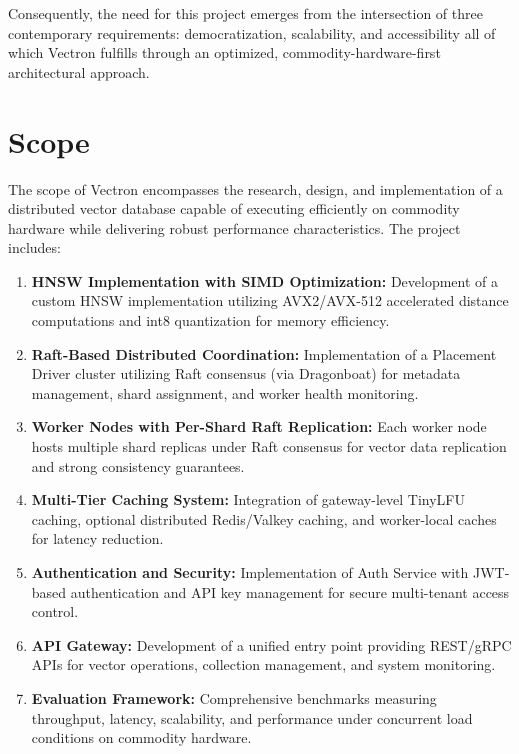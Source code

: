 
\noindent Consequently, the need for this project emerges from the intersection of three contemporary requirements: democratization, scalability, and accessibility all of which Vectron fulfills through an optimized, commodity-hardware-first architectural approach.

\section{Scope}

The scope of Vectron encompasses the research, design, and implementation of a distributed vector database capable of executing efficiently on commodity hardware while delivering robust performance characteristics. The project includes:

\begin{enumerate}

    \item \textbf{HNSW Implementation with SIMD Optimization:} Development of a custom HNSW implementation utilizing AVX2/AVX-512 accelerated distance computations and int8 quantization for memory efficiency.
    
    \item \textbf{Raft-Based Distributed Coordination:} Implementation of a Placement Driver cluster utilizing Raft consensus (via Dragonboat) for metadata management, shard assignment, and worker health monitoring.
    
    \item \textbf{Worker Nodes with Per-Shard Raft Replication:} Each worker node hosts multiple shard replicas under Raft consensus for vector data replication and strong consistency guarantees.
    
    \item \textbf{Multi-Tier Caching System:} Integration of gateway-level TinyLFU caching, optional distributed Redis/Valkey caching, and worker-local caches for latency reduction.
    
    \item \textbf{Authentication and Security:} Implementation of Auth Service with JWT-based authentication and API key management for secure multi-tenant access control.
    
    \item \textbf{API Gateway:} Development of a unified entry point providing REST/gRPC APIs for vector operations, collection management, and system monitoring.
    
    \item \textbf{Evaluation Framework:} Comprehensive benchmarks measuring throughput, latency, scalability, and performance under concurrent load conditions on commodity hardware.
     
\end{enumerate}

